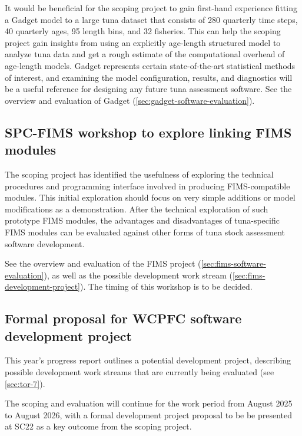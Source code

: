 \documentclass{SCreport}
\begin{document}
It would be beneficial for the scoping project to gain first-hand experience
fitting a Gadget model to a large tuna dataset that consists of 280 quarterly
time steps, 40 quarterly ages, 95 length bins, and 32 fisheries. This can help
the scoping project gain insights from using an explicitly age-length structured
model to analyze tuna data and get a rough estimate of the computational
overhead of age-length models. Gadget represents certain state-of-the-art
statistical methods of interest, and examining the model configuration, results,
and diagnostics will be a useful reference for designing any future tuna
assessment software. See the overview and evaluation of Gadget
(\autoref{sec:gadget-software-evaluation}).

\vspace{2ex}

\subsection{SPC-FIMS workshop to explore linking FIMS modules}
\label{sec:fims-workshop}

The scoping project has identified the usefulness of exploring the technical
procedures and programming interface involved in producing FIMS-compatible
modules. This initial exploration should focus on very simple additions or model
modifications as a demonstration. After the technical exploration of such
prototype FIMS modules, the advantages and disadvantages of tuna-specific FIMS
modules can be evaluated against other forms of tuna stock assessment software
development.

See the overview and evaluation of the FIMS project
(\autoref{sec:fims-software-evaluation}), as well as the possible development
work stream (\autoref{sec:fims-development-project}). The timing of this
workshop is to be decided.

\vspace{2ex}

\subsection{Formal proposal for WCPFC software development project}
\label{sec:development-proposal-sc22}

This year's progress report outlines a potential development project, describing
possible development work streams that are currently being evaluated (see
\autoref{sec:tor-7}).

The scoping and evaluation will continue for the work period from August 2025 to
August 2026, with a formal development project proposal to be be presented at
SC22 as a key outcome from the scoping project.
\end{document}

